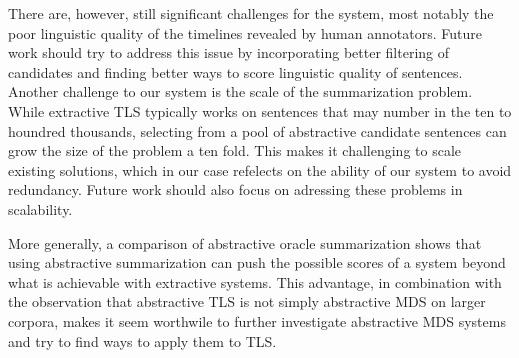 \documentclass[a4paper,BCOR=10mm]{report}
\numberwithin{lemma}{chapter}
\numberwithin{definition}{chapter}
\begin{document}
There are, however, still significant challenges for the system, most notably the poor linguistic quality of the timelines revealed by human annotators.
Future work should try to address this issue by incorporating better filtering of candidates and finding better ways to score linguistic quality of sentences.
Another challenge to our system is the scale of the summarization problem. While extractive TLS typically works on sentences that may number in the ten to houndred thousands, selecting from a pool of abstractive candidate sentences can grow the size of the problem a ten fold. This makes it challenging to scale existing solutions, which in our case refelects on the ability of our system to avoid redundancy.
Future work should also focus on adressing these problems in scalability.

More generally, a comparison of abstractive oracle summarization shows that using abstractive summarization can push the possible scores of a system beyond what is achievable with extractive systems. This advantage, in combination with the observation that abstractive TLS is not simply abstractive MDS on larger corpora, makes it seem worthwile to further investigate abstractive MDS systems and try to find ways to apply them to TLS.



 
\end{document}
